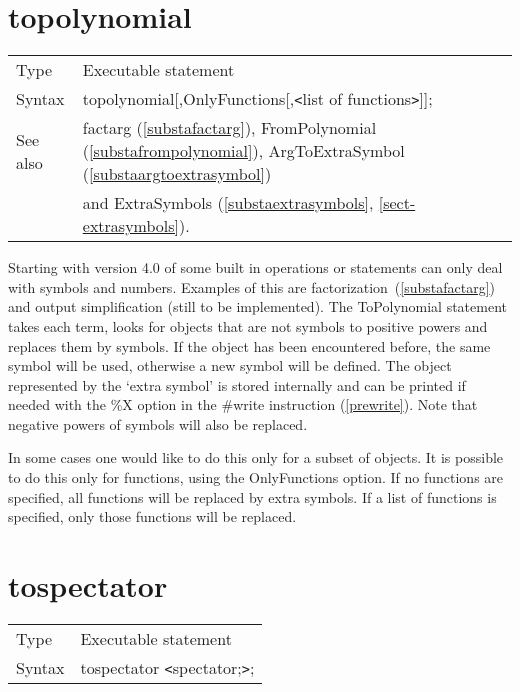\section{topolynomial}
\label{substatopolynomial}

\noindent \begin{tabular}{ll}
Type & Executable statement\\
Syntax & topolynomial[,OnlyFunctions[,{\tt<}list of functions{\tt>}]];
\\ See also & factarg (\ref{substafactarg}), FromPolynomial 
(\ref{substafrompolynomial}), ArgToExtraSymbol (\ref{substaargtoextrasymbol}) 
\\& and ExtraSymbols (\ref{substaextrasymbols},
\ref{sect-extrasymbols}).
\end{tabular} \vspace{4mm}

\noindent Starting with version 4.0 of \FORM{} some built in operations or
statements can only deal with symbols and numbers. Examples of this are 
factorization~(\ref{substafactarg}) and output simplification (still to be 
implemented). The ToPolynomial statement takes each term, looks for objects 
that are not symbols to positive powers and replaces them by symbols. If 
the object has been encountered before, the same symbol will be used, 
otherwise a new symbol will be defined. The object represented by the 
`extra symbol' is stored internally and can be printed if needed with the 
\%X option in the \#write instruction (\ref{prewrite}). Note that negative 
powers of symbols will also be replaced.

In some cases one would like to do this only for a subset of objects. It is 
possible to do this only for functions, using the OnlyFunctions option. If 
no functions are specified, all functions will be replaced by extra 
symbols. If a list of functions is specified, only those functions will be 
replaced.
\vspace{10mm}


\section{tospectator}
\label{substatospectator}

\noindent \begin{tabular}{ll}
Type & Executable statement\\
Syntax & tospectator {\tt<}spectator;{\tt>};
\end{tabular} \vspace{4mm}

